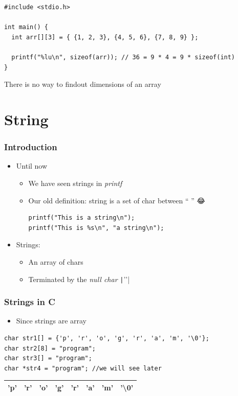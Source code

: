 \documentclass{../c-lecture}
\begin{document}
\begin{frame}[fragile]
  \begin{verbatim}
#include <stdio.h>

int main() {
  int arr[][3] = { {1, 2, 3}, {4, 5, 6}, {7, 8, 9} };

  printf("%lu\n", sizeof(arr)); // 36 = 9 * 4 = 9 * sizeof(int)
}
  \end{verbatim}
  \begin{block}{}
    There is no way to findout dimensions of an array
  \end{block}
\end{frame}

\section{String}

\begin{frame}[fragile]
  \frametitle{Introduction}
  \begin{itemize}
    \item Until now
    \begin{itemize}
      \item We have seen strings in \textit{\color{Cyan} printf}
      \item Our old definition: string is a set of char between `` '' 😂
      \begin{verbatim}
printf("This is a string\n");
printf("This is %s\n", "a string\n");
      \end{verbatim}
    \end{itemize}
    \item Strings:
    \begin{itemize}
      \item An array of chars
      \item Terminated by the \textit{\color{Orange} null char} \texttt|'\0'|
    \end{itemize}
  \end{itemize}
\end{frame}

\begin{frame}[fragile]
  \frametitle{Strings in C}
  \begin{itemize}
    \item Since strings are array
  \end{itemize}
  \begin{verbatim}
char str1[] = {'p', 'r', 'o', 'g', 'r', 'a', 'm', '\0'};
char str2[8] = "program";
char str3[] = "program";
char *str4 = "program"; //we will see later
  \end{verbatim}
  \begin{table}
  \begin{tabular}{*{8}{c}}
    \toprule
    'p' &
    'r' &
    'o' &
    'g' &
    'r' &
    'a' &
    'm' &
    {\color{Orange} '\textbackslash 0'} \\
    \bottomrule
  \end{tabular}
  \end{table}
\end{frame}
\end{document}
